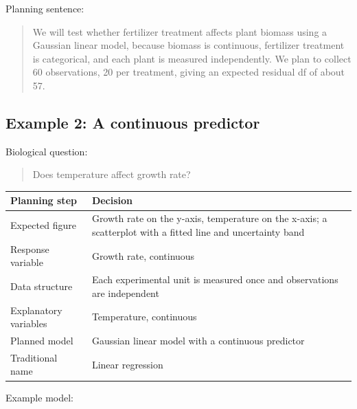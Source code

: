 \documentclass[
  letterpaper,
  8pt,
  a4paper]{book}
\newcounter{none} %
\begin{document}
Planning sentence:

\begin{quote}
We will test whether fertilizer treatment affects plant biomass using a
Gaussian linear model, because biomass is continuous, fertilizer
treatment is categorical, and each plant is measured independently. We
plan to collect 60 observations, 20 per treatment, giving an expected
residual df of about 57.
\end{quote}

\subsection*{Example 2: A continuous
predictor}\label{example-2-a-continuous-predictor}

Biological question:

\begin{quote}
Does temperature affect growth rate?
\end{quote}

{\def\LTcaptype{none} %
\begin{longtable}[]{@{}
  >{\raggedright\arraybackslash}p{}
  >{\raggedright\arraybackslash}p{}@{}}
\toprule\noalign{}
\begin{minipage}[b]{\linewidth}\raggedright
Planning step
\end{minipage} & \begin{minipage}[b]{\linewidth}\raggedright
Decision
\end{minipage} \\
\midrule\noalign{}
\endhead
\bottomrule\noalign{}
\endlastfoot
Expected figure & Growth rate on the y-axis, temperature on the x-axis;
a scatterplot with a fitted line and uncertainty band \\
Response variable & Growth rate, continuous \\
Data structure & Each experimental unit is measured once and
observations are independent \\
Explanatory variables & Temperature, continuous \\
Planned model & Gaussian linear model with a continuous predictor \\
Traditional name & Linear regression \\
\end{longtable}
}

Example model:
\end{document}
